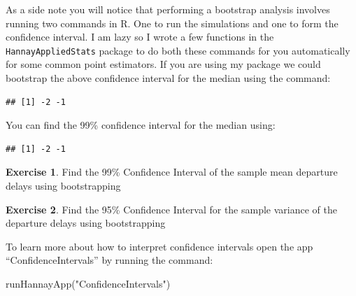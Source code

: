 \documentclass[
]{book}
\newenvironment{Shaded}{\begin{snugshade}}{\end{snugshade}}
\newcommand{\AttributeTok}[1]{\textcolor[rgb]{0.77,0.63,0.00}{#1}}
\newcommand{\FloatTok}[1]{\textcolor[rgb]{0.00,0.00,0.81}{#1}}
\newcommand{\FunctionTok}[1]{\textcolor[rgb]{0.00,0.00,0.00}{#1}}
\newcommand{\NormalTok}[1]{#1}
\newcommand{\SpecialCharTok}[1]{\textcolor[rgb]{0.00,0.00,0.00}{#1}}
\newcommand{\StringTok}[1]{\textcolor[rgb]{0.31,0.60,0.02}{#1}}
\theoremstyle{definition}
\theoremstyle{definition}
\theoremstyle{definition}
\newtheorem{exercise}{Exercise}[chapter]
\theoremstyle{definition}
\theoremstyle{remark}
\begin{document}
As a side note you will notice that performing a bootstrap analysis involves running two commands in R. One to run the simulations and one to form the confidence interval. I am lazy so I wrote a few functions in the \texttt{HannayAppliedStats} package to do both these commands for you automatically for some common point estimators. If you are using my package we could bootstrap the above confidence interval for the median using the command:

\begin{Shaded}
\end{Shaded}

\begin{verbatim}
## [1] -2 -1
\end{verbatim}

You can find the 99\% confidence interval for the median using:

\begin{Shaded}
\end{Shaded}

\begin{verbatim}
## [1] -2 -1
\end{verbatim}

\begin{exercise}
\protect\hypertarget{exr:unnamed-chunk-372}{}\label{exr:unnamed-chunk-372}Find the 99\% Confidence Interval of the sample mean departure delays using bootstrapping
\end{exercise}

\begin{exercise}
\protect\hypertarget{exr:unnamed-chunk-373}{}\label{exr:unnamed-chunk-373}Find the 95\% Confidence Interval for the sample variance of the departure delays using bootstrapping
\end{exercise}

To learn more about how to interpret confidence intervals open the app ``ConfidenceIntervals'' by running the command:

\begin{Shaded}
\begin{Highlighting}[]
\FunctionTok{runHannayApp}\NormalTok{(}\StringTok{"ConfidenceIntervals"}\NormalTok{)}
\end{Highlighting}
\end{Shaded}
\end{document}

